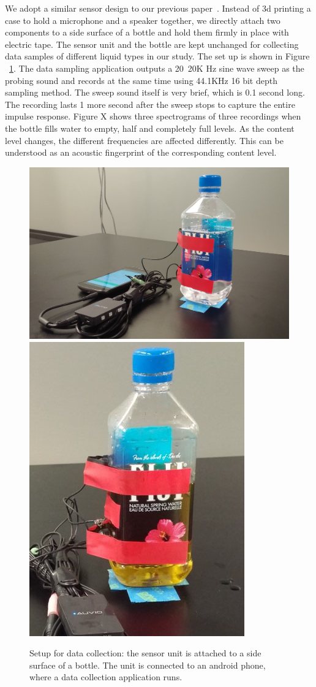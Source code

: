 \documentclass{article} %
\begin{document}
We adopt a similar sensor design to our previous paper~\cite{fan2015soqr}. Instead of 3d printing a case to hold a microphone and a speaker together, we directly attach two components to a side surface of a bottle and hold them firmly in place with electric tape. The sensor unit and the bottle are kept unchanged for collecting data samples of different liquid types in our study. The set up is shown in Figure ~\ref{fig:set-up}. The data sampling application outputs a 20~20K Hz sine wave sweep as the probing sound and records at the same time using 44.1KHz 16 bit depth sampling method. The sweep sound itself is very brief, which is 0.1 second long. The recording lasts 1 more second after the sweep stops to capture the entire impulse response. Figure X shows three spectrograms of three recordings when the bottle fills water to empty, half and completely full levels. As the content level changes, the different frequencies are affected differently. This can be understood as an acoustic fingerprint of the corresponding content level.  
\begin{figure}
\centering
  \includegraphics[width=0.5\linewidth]{setup1.jpg}
  \includegraphics[width=0.242\linewidth]{setup2.jpg}
  \caption{Setup for data collection: the sensor unit is attached to a side surface of a bottle. The unit is connected to an android phone, where a data collection application runs.}
  \label{fig:set-up}
\end{figure}
\end{document}
